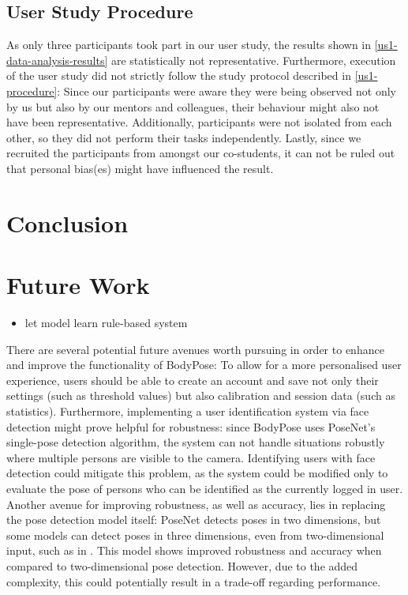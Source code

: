 \subsection{User Study Procedure}
As only three participants took part in our user study, the results shown in \ref{us1-data-analysis-results} are statistically not representative. Furthermore, execution of the user study did not strictly follow the study protocol described in \ref{us1-procedure}: Since our participants were aware they were being observed not only by us but also by our mentors and colleagues, their behaviour might also not have been representative. Additionally, participants were not isolated from each other, so they did not perform their tasks independently. Lastly, since we recruited the participants from amongst our co-students, it can not be ruled out that personal bias(es) might have influenced the result.

\section{Conclusion} %
\label{conclusion}

\section{Future Work}
\begin{itemize}
    \item let model learn rule-based system
\end{itemize}
There are several potential future avenues worth pursuing in order to enhance and improve the functionality of BodyPose: To allow for a more personalised user experience, users should be able to create an account and save not only their settings (such as threshold values) but also calibration and session data (such as statistics). Furthermore, implementing a user identification system via face detection might prove helpful for robustness: since BodyPose uses PoseNet's single-pose detection algorithm, the system can not handle situations robustly where multiple persons are visible to the camera. Identifying users with face detection could mitigate this problem, as the system could be modified only to evaluate the pose of persons who can be identified as the currently logged in user. Another avenue for improving robustness, as well as accuracy, lies in replacing the pose detection model itself: PoseNet detects poses in two dimensions, but some models can detect poses in three dimensions, even from two-dimensional input, such as in \cite{Arnab_2019}. This model shows improved robustness and accuracy when compared to two-dimensional pose detection. However, due to the added complexity, this could potentially result in a trade-off regarding performance.

